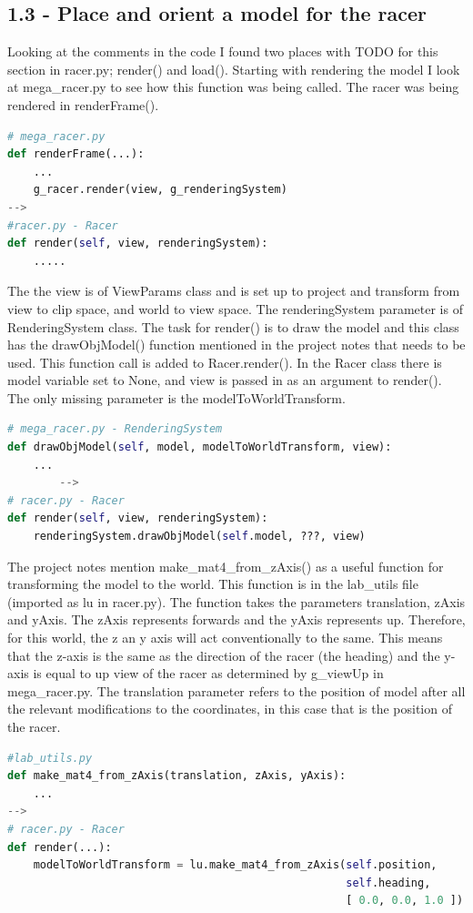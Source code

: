 \documentclass[a4 paper, 12pt]{article}
\begin{document}
\subsection{1.3 - Place and orient a model for the racer}
Looking at the comments in the code I found two places with TODO for this section in racer.py; render() and load(). Starting with rendering the model I look at mega\_racer.py to see how this function was being called. The racer was being rendered in renderFrame().
    \begin{lstlisting}[language=python]    
# mega_racer.py
def renderFrame(...):
    ...
    g_racer.render(view, g_renderingSystem)  
-->
#racer.py - Racer
def render(self, view, renderingSystem):
    .....
    \end{lstlisting}  

The the view is of ViewParams class and is set up to project and transform from view to clip space, and world to view space. The renderingSystem parameter is of RenderingSystem class. The task for render() is to draw the model and this class has the drawObjModel() function mentioned in the project notes that needs to be used. This function call is added to Racer.render(). In the Racer class there is model variable set to None, and view is passed in as an argument to render(). The only missing parameter is the modelToWorldTransform.
    \begin{lstlisting}[language=python]   
# mega_racer.py - RenderingSystem
def drawObjModel(self, model, modelToWorldTransform, view):
    ...
        -->
# racer.py - Racer
def render(self, view, renderingSystem):
    renderingSystem.drawObjModel(self.model, ???, view)
    \end{lstlisting}  

The project notes mention make\_mat4\_from\_zAxis() as a useful function for transforming the model to the world. This function is in the lab\_utils file (imported as lu in racer.py). The function takes the parameters translation, zAxis and yAxis. The zAxis represents forwards and the yAxis represents up. Therefore, for this world, the z an y axis will act conventionally to the same. This means that the z-axis is the same as the direction of the racer (the heading) and the y-axis is equal to up view of the racer as determined by g\_viewUp in mega\_racer.py. The translation parameter refers to the position of model after all the relevant modifications to the coordinates, in this case that is the position of the racer.
    \begin{lstlisting}[language=python]  
#lab_utils.py    
def make_mat4_from_zAxis(translation, zAxis, yAxis):
    ...
-->
# racer.py - Racer
def render(...):
    modelToWorldTransform = lu.make_mat4_from_zAxis(self.position, 
                                                    self.heading, 
                                                    [ 0.0, 0.0, 1.0 ])
    \end{lstlisting}
\end{document}
